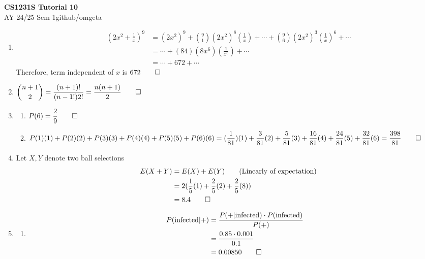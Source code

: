 \documentclass[12pt, a4paper]{article}
\newcommand{\mytitle}{CS1231S Tutorial 10}
\newcommand{\myauthor}{github/omgeta}
\newcommand{\mydate}{AY 24/25 Sem 1}
\begin{document}
\raggedright
\footnotesize
\begin{center}
{\normalsize{\textbf{\mytitle}}} \\
{\footnotesize{\mydate\hspace{2pt}\textemdash\hspace{2pt}\myauthor}}
\end{center}
\begin{enumerate}[Q\arabic*.]
  \item 
     \begin{align*}
       (2x^2+\frac{1}{x})^9 &= (2x^2)^9 + \binom 91 (2x^2)^8(\frac{1}{x})+\cdots+\binom96(2x^2)^3(\frac{1}{x})^6+\cdots\\
                            &=\cdots+(84)(8x^6)(\frac{1}{x^6})+\cdots\\
                            &=\cdots+672+\cdots
     \end{align*}
     Therefore, term independent of $x$ is $672 \qed$

  \item $\displaystyle \binom {n+1}2 = \frac{(n+1)!}{(n-1!)2!} = \frac{n(n+1)}{2} \qed$

  \item 
    \begin{enumerate}[(\alph*)]
      \item $\displaystyle P(6) = \frac{2}{9} \qed$
      \item $\displaystyle P(1)(1) + P(2)(2) + P(3)(3) + P(4)(4) + P(5)(5) + P(6)(6) = (\frac{1}{81})(1) + \frac{3}{81}(2) + \frac{5}{81}(3) + \frac{16}{81}(4) + \frac{24}{81}(5) + \frac{32}{81}(6) = \frac{398}{81}\qed$ 
    \end{enumerate}

  \item Let $X,Y$ denote two ball selections
    \begin{align*}
      E(X+Y) &= E(X) + E(Y)\tag*{(Linearly of expectation)}\\
             &= 2(\frac{1}{5}(1) + \frac{2}{5}(2) + \frac{2}{5}(8))\\
             &= 8.4 \qed
    \end{align*}

  \item 
    \begin{enumerate}[(\alph*)]
      \item 
        \begin{align*}
          P(\text{infected}|+)               &= \frac{P(+|\text{infected})\cdot P(\text{infected})}{P(+)}\\
                                             &= \frac{0.85 \cdot 0.001}{0.1}\\
                                             &= 0.00850 \qed
        \end{align*}


\end{enumerate}
\end{enumerate}
\end{document}
